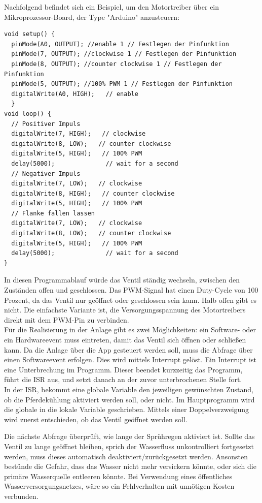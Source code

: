 Nachfolgend befindet sich ein Beispiel, um den Motortreiber über ein Mikroprozessor-Board, der Type "{}Arduino"{} anzusteuern:

\begin{lstlisting}[language=Arduino, caption={Arduino Motortreibersteuerung}]
void setup() {
  pinMode(A0, OUTPUT); //enable 1 // Festlegen der Pinfunktion
  pinMode(7, OUTPUT); //clockwise 1 // Festlegen der Pinfunktion
  pinMode(8, OUTPUT); //counter clockwise 1 // Festlegen der Pinfunktion
  pinMode(5, OUTPUT); //100% PWM 1 // Festlegen der Pinfunktion
  digitalWrite(A0, HIGH);   // enable
  }
void loop() {
  // Positiver Impuls
  digitalWrite(7, HIGH);   // clockwise
  digitalWrite(8, LOW);   // counter clockwise 
  digitalWrite(5, HIGH);   // 100% PWM
  delay(5000);              // wait for a second
  // Negativer Impuls
  digitalWrite(7, LOW);   // clockwise
  digitalWrite(8, HIGH);   // counter clockwise 
  digitalWrite(5, HIGH);   // 100% PWM 
  // Flanke fallen lassen
  digitalWrite(7, LOW);   // clockwise
  digitalWrite(8, LOW);   // counter clockwise 
  digitalWrite(5, HIGH);   // 100% PWM
  delay(5000);              // wait for a second
}
\end{lstlisting}

In diesen Programmablauf würde das Ventil ständig wechseln, zwischen den Zuständen offen und geschlossen. Das PWM-Signal hat einen Duty-Cycle von 100 Prozent, da das Ventil nur geöffnet oder geschlossen sein kann. Halb offen gibt es nicht. Die einfachste Variante ist, die Versorgungsspannung des Motortreibers direkt mit dem PWM-Pin zu verbinden.\\
Für die Realisierung in der Anlage gibt es zwei Möglichkeiten: ein Software- oder ein Hardwareevent muss eintreten, damit das Ventil sich öffnen oder schließen kann. Da die Anlage über die App gesteuert werden soll, muss die Abfrage über einen Softwareevent erfolgen. Dies wird mittels Interrupt gelöst. Ein Interrupt ist eine Unterbrechung im Programm. Dieser beendet kurzzeitig das Programm, führt die \ac{ISR} aus, und setzt danach an der zuvor unterbrochenen Stelle fort. \\ In der \ac{ISR}, bekommt eine globale Variable den jeweiligen gewünschten Zustand, ob die Pferdekühlung aktiviert werden soll, oder nicht. Im Hauptprogramm wird die globale in die lokale Variable geschrieben. Mittels einer Doppelverzweigung wird zuerst entschieden, ob das Ventil geöffnet werden soll. \newpage 

Die nächste Abfrage überprüft, wie lange der Sprühregen aktiviert ist. Sollte das Ventil zu lange geöffnet bleiben, sprich der Wasserfluss unkontrolliert fortgesetzt werden, muss dieses automatisch deaktiviert/zurückgesetzt werden. Ansonsten bestünde die Gefahr, dass das Wasser nicht mehr versickern könnte, oder sich die primäre Wasserquelle entleeren könnte. Bei Verwendung eines öffentliches Wasserversorgungsnetzes, wäre so ein Fehlverhalten mit unnötigen Kosten verbunden.

